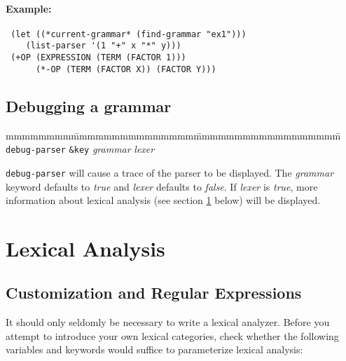 \paragraph {Example:}
{\tt \begin{verbatim}
 (let ((*current-grammar* (find-grammar "ex1")))
    (list-parser '(1 "+" x "*" y)))
 (+OP (EXPRESSION (TERM (FACTOR 1)))
      (*-OP (TERM (FACTOR X)) (FACTOR Y)))
     \end{verbatim}}

\subsection{Debugging a grammar}

\begin{tabbing}
mmmmmmmm\=mmmmmmmmmmmmmmm\=mmmmmmmmmmmmmmmmmm\=\kill
{\tt debug-parser} {\tt \&key} {\em grammar} {\em lexer} \>\> 
\end{tabbing}
{\tt debug-parser} will cause a trace of
the parser to be displayed.  The {\em
  grammar} keyword defaults to {\em true}
and {\em lexer} defaults to {\em false}.
If {\em lexer} is {\em true}, more information about lexical analysis
(see section \ref{lex} below) will be displayed.

\section {Lexical Analysis} \label{lex}
\subsection{Customization and Regular Expressions}

It should only seldomly be necessary to write a lexical analyzer.
Before you attempt to introduce your own lexical categories, check
whether the following variables and keywords would suffice to
parameterize lexical analysis:

